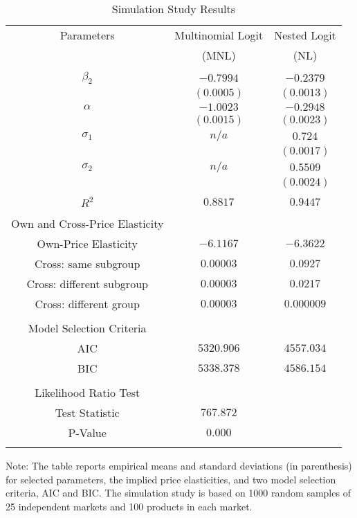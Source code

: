 \documentclass[a4paper,11pt]{article}
\begin{document}
    \begin{table}[htbp]
        \caption{Simulation Study Results}
        \centering
        \begin{tabular}{ccc}\\
            \hline 
            Parameters & Multinomial Logit & Nested Logit\\ 
                       & (MNL) & (NL)\\
            \hline\\
            $\beta_{2}$     & $-0.7994$    & $-0.2379$\\
                            & $(0.0005)$ & $(0.0013)$\\
            $\alpha$        & $-1.0023$   & $-0.2948$\\
                            & $(0.0015)$  & $(0.0023)$\\
            $\sigma_{1}$    & $n/a$      & $0.724$\\
                            &            & $(0.0017)$\\
            $\sigma_{2}$    & $n/a$      & $0.5509$\\
                            &            & $(0.0024)$\\
            \hline\\
            $R^{2}$         & $0.8817$     & $0.9447$\\
            \hline\\
            Own and Cross-Price Elasticity &          &        \\
            Own-Price Elasticity           & $-6.1167$ & $-6.3622$\\
            Cross: same subgroup           & $0.00003$  & $0.0927$\\
            Cross: different subgroup      & $0.00003$  & $0.0217$\\
            Cross: different group         & $0.00003$  & $0.000009$\\
            \hline\\
            Model Selection Criteria &            &          \\
            AIC                      & $5320.906$ & $4557.034$\\
            BIC                      & $5338.378$ & $4586.154$\\
            \hline\\
            Likelihood Ratio Test   &           &\\
            Test Statistic          & $767.872$ &\\
            P-Value                 & $0.000$   &\\
            \hline\\
        \end{tabular}
        \footnotesize
        \item Note: The table reports empirical means and standard deviations (in parenthesis) for selected parameters, the implied price elasticities, and two model selection criteria, AIC and BIC. The simulation study is based on 1000 random samples of 25 independent markets and 100 products in each market.
        \label{tab: Simulation Results} 
    \end{table}
    
\end{document}
